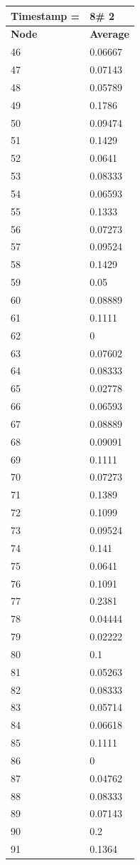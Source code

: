 \begin{tabular}{|l||l|}
\hline
\textbf{Timestamp =} & \textbf{8}\# 2\\\hline
	\textbf{Node} & \textbf{Average} \\ \hline
\hline
	46 & 0.06667 \\ \hline
	47 & 0.07143 \\ \hline
	48 & 0.05789 \\ \hline
	49 & 0.1786 \\ \hline
	50 & 0.09474 \\ \hline
	51 & 0.1429 \\ \hline
	52 & 0.0641 \\ \hline
	53 & 0.08333 \\ \hline
	54 & 0.06593 \\ \hline
	55 & 0.1333 \\ \hline
	56 & 0.07273 \\ \hline
	57 & 0.09524 \\ \hline
	58 & 0.1429 \\ \hline
	59 & 0.05 \\ \hline
	60 & 0.08889 \\ \hline
	61 & 0.1111 \\ \hline
	62 & 0 \\ \hline
	63 & 0.07602 \\ \hline
	64 & 0.08333 \\ \hline
	65 & 0.02778 \\ \hline
	66 & 0.06593 \\ \hline
	67 & 0.08889 \\ \hline
	68 & 0.09091 \\ \hline
	69 & 0.1111 \\ \hline
	70 & 0.07273 \\ \hline
	71 & 0.1389 \\ \hline
	72 & 0.1099 \\ \hline
	73 & 0.09524 \\ \hline
	74 & 0.141 \\ \hline
	75 & 0.0641 \\ \hline
	76 & 0.1091 \\ \hline
	77 & 0.2381 \\ \hline
	78 & 0.04444 \\ \hline
	79 & 0.02222 \\ \hline
	80 & 0.1 \\ \hline
	81 & 0.05263 \\ \hline
	82 & 0.08333 \\ \hline
	83 & 0.05714 \\ \hline
	84 & 0.06618 \\ \hline
	85 & 0.1111 \\ \hline
	86 & 0 \\ \hline
	87 & 0.04762 \\ \hline
	88 & 0.08333 \\ \hline
	89 & 0.07143 \\ \hline
	90 & 0.2 \\ \hline
	91 & 0.1364 \\ \hline
\end{tabular}
